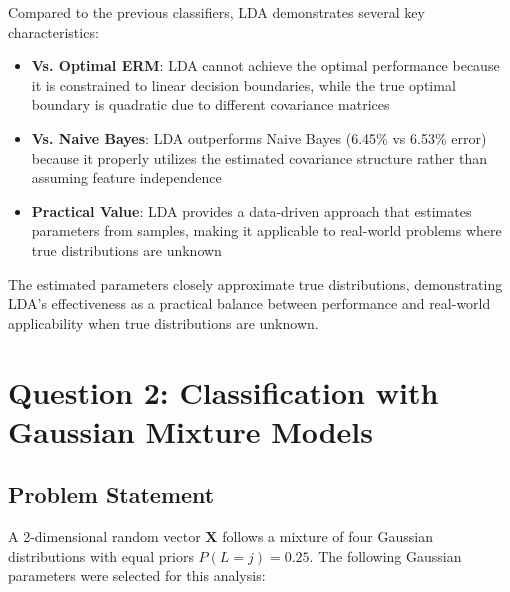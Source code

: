 \documentclass[12pt]{article}
\begin{document}
Compared to the previous classifiers, LDA demonstrates several key characteristics:
\begin{itemize}
\item \textbf{Vs. Optimal ERM}: LDA cannot achieve the optimal performance because it is constrained to linear decision boundaries, while the true optimal boundary is quadratic due to different covariance matrices
\item \textbf{Vs. Naive Bayes}: LDA outperforms Naive Bayes (6.45\% vs 6.53\% error) because it properly utilizes the estimated covariance structure rather than assuming feature independence
\item \textbf{Practical Value}: LDA provides a data-driven approach that estimates parameters from samples, making it applicable to real-world problems where true distributions are unknown
\end{itemize}

The estimated parameters closely approximate true distributions, demonstrating LDA's effectiveness as a practical balance between performance and real-world applicability when true distributions are unknown.

\newpage
\section{Question 2: Classification with Gaussian Mixture Models}

\subsection{Problem Statement}
A 2-dimensional random vector $\mathbf{X}$ follows a mixture of four Gaussian distributions with equal priors $P(L=j) = 0.25$. The following Gaussian parameters were selected for this analysis:
\end{document}
